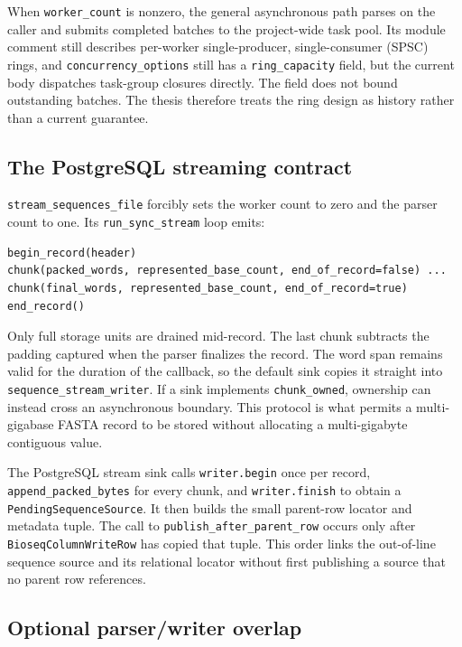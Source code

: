 When \texttt{worker\_count} is nonzero, the general asynchronous path parses on
the caller and submits completed batches to the project-wide task pool.  Its
module comment still describes per-worker single-producer,
single-consumer (SPSC) rings, and
\texttt{concurrency\_options} still has a \texttt{ring\_capacity} field, but
the current body dispatches task-group closures directly.  The field does not
bound outstanding batches.  The thesis therefore treats the ring design as
history rather than a current guarantee.

\subsection{The PostgreSQL streaming contract}

\texttt{stream\_sequences\_file} forcibly sets the worker count to zero and the
parser count to one.  Its \texttt{run\_sync\_stream} loop emits:

\begin{verbatim}
begin_record(header)
chunk(packed_words, represented_base_count, end_of_record=false) ...
chunk(final_words, represented_base_count, end_of_record=true)
end_record()
\end{verbatim}

Only full storage units are drained mid-record.  The last chunk subtracts the
padding captured when the parser finalizes the record. The word span remains
valid for the duration of the callback, so the default sink copies it straight
into \texttt{sequence\_stream\_writer}.  If a sink implements
\texttt{chunk\_owned}, ownership can instead cross an asynchronous boundary.
This protocol is what permits a multi-gigabase FASTA record to be stored
without allocating a multi-gigabyte contiguous value.

The PostgreSQL stream sink calls \texttt{writer.begin} once per record,
\texttt{append\_packed\_bytes} for every chunk, and
\texttt{writer.finish} to obtain a \texttt{PendingSequenceSource}.  It then
builds the small parent-row locator and metadata tuple.  The call to
\texttt{publish\_after\_parent\_row} occurs only after
\texttt{BioseqColumnWriteRow} has copied that tuple.  This order links the
out-of-line sequence source and its relational locator without first
publishing a source that no parent row references.

\subsection{Optional parser/writer overlap}

